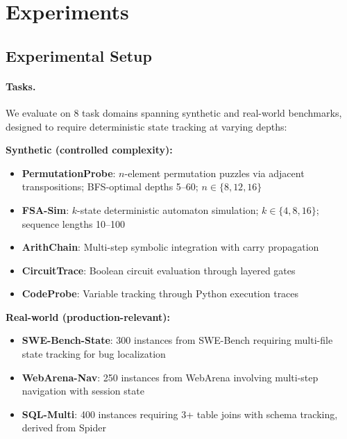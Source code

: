\documentclass{article}
\theoremstyle{plain}
\theoremstyle{definition}
\theoremstyle{remark}
\begin{document}

\section{Experiments}
\label{sec:experiments}

\subsection{Experimental Setup}

\paragraph{Tasks.} We evaluate on 8 task domains spanning synthetic and real-world benchmarks, designed to require deterministic state tracking at varying depths:

\textbf{Synthetic (controlled complexity):}
\begin{itemize}[leftmargin=*,itemsep=0pt]
\item \textbf{PermutationProbe}: $n$-element permutation puzzles via adjacent transpositions; BFS-optimal depths 5--60; $n \in \{8, 12, 16\}$
\item \textbf{FSA-Sim}: $k$-state deterministic automaton simulation; $k \in \{4, 8, 16\}$; sequence lengths 10--100
\item \textbf{ArithChain}: Multi-step symbolic integration with carry propagation
\item \textbf{CircuitTrace}: Boolean circuit evaluation through layered gates
\item \textbf{CodeProbe}: Variable tracking through Python execution traces
\end{itemize}

\textbf{Real-world (production-relevant):}
\begin{itemize}[leftmargin=*,itemsep=0pt]
\item \textbf{SWE-Bench-State}: 300 instances from SWE-Bench \citep{jimenez2024swebench} requiring multi-file state tracking for bug localization
\item \textbf{WebArena-Nav}: 250 instances from WebArena \citep{zhou2024webarena} involving multi-step navigation with session state
\item \textbf{SQL-Multi}: 400 instances requiring 3+ table joins with schema tracking, derived from Spider \citep{yu2018spider}
\end{itemize}
\end{document}
